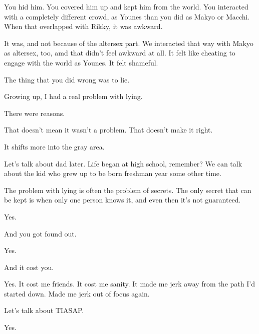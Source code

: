 \begin{paracol}{2}
\begin{leftcolumn}
\begin{ally}
You hid him. You covered him up and kept him from the world. You interacted with a completely different crowd, as Younes than you did as Makyo or Macchi. When that overlapped with Rikky, it was awkward.
\end{ally}
It was, and not because of the altersex part. We interacted that way with Makyo as altersex, too, amd that didn't feel awkward at all. It felt like cheating to engage with the world as Younes. It felt shameful.

\begin{ally}
The thing that you did wrong was to lie.
\end{ally}
\newpage

\noindent Growing up, I had a real problem with lying.

\begin{ally}
There were reasons.
\end{ally}
That doesn't mean it wasn't a problem. That doesn't make it right.

\begin{ally}
It shifts more into the gray area.
\end{ally}
Let's talk about dad later. Life began at high school, remember? We can talk about the kid who grew up to be born freshman year some other time.

\begin{ally}
The problem with lying is often the problem of secrets. The only secret that can be kept is when only one person knows it, and even then it's not guaranteed.
\end{ally}
Yes.

\begin{ally}
And you got found out.
\end{ally}
Yes.

\begin{ally}
And it cost you.
\end{ally}
Yes. It cost me friends. It cost me sanity. It made me jerk away from the path I'd started down. Made me jerk out of focus again.

\begin{ally}
Let's talk about TIASAP.
\end{ally}
Yes.
\newpage
\end{leftcolumn}
\end{paracol}
